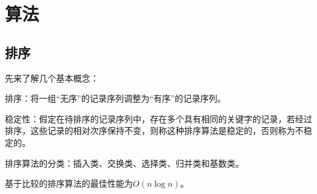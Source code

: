 \chapter{算法}

\section{排序}

先来了解几个基本概念：

排序：将一组“无序”的记录序列调整为“有序”的记录序列。

稳定性：假定在待排序的记录序列中，存在多个具有相同的关键字的记录，若经过排序，这些记录的相对次序保持不变，则称这种排序算法是稳定的，否则称为不稳定的。

排序算法的分类：插入类、交换类、选择类、归并类和基数类。

基于⽐较的排序算法的最佳性能为$ O(n\log n) $。